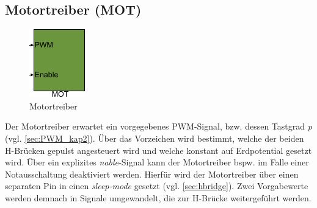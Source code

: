 \subsection{Motortreiber (MOT)} \label{subsec:MOT}

\begin{figure}[H]%
\centering
\includegraphics[width=0.2\columnwidth]{./Bilder/fig_mot}%
\caption{Motortreiber}%
\label{fig_mot}%
\end{figure}

Der Motortreiber erwartet ein vorgegebenes PWM-Signal, bzw. dessen Tastgrad \textit{p} (vgl. \autoref{sec:PWM_kap2}). Über das Vorzeichen wird bestimmt, welche der beiden H-Brücken gepulst angesteuert wird und welche konstant auf Erdpotential gesetzt wird. Über ein explizites \textit{nable}-Signal kann der Motortreiber bspw. im Falle einer Notausschaltung deaktiviert werden. Hierfür wird der Motortreiber über einen separaten Pin in einen \textit{sleep-mode} gesetzt (vgl. \autoref{sec:hbridge}). Zwei Vorgabewerte werden demnach in Signale umgewandelt, die zur H-Brücke weitergeführt werden.


